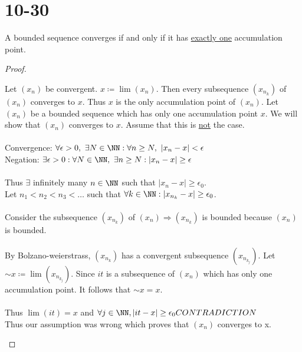 \documentclass[class=scrartcl, crop=false]{standalone}
\begin{document}
\section{10-30}

\begin{theorem}
  A bounded sequence converges if and only if it has \ul{exactly one} accumulation point.
  \begin{proof}
    \begin{itemize}
      \ii[]
      \ii[$(\Rightarrow)$ ]
      Let $(x_n)$ be convergent. $x \coloneqq \lim(x_n)$. Then every subsequence $(x_{n_k})$ of $(x_n)$ converges to $x$. Thus $x$ is the only accumulation point of $(x_n)$.
      \ii[$(\Leftarrow)$ ]
      Let $(x_n)$ be a bounded sequence which has only one accumulation point $x$. We will show that $(x_n)$ converges to $x$. Assume that this is \ul{not} the case.
      \\\\
      Convergence: $\forall \epsilon > 0, \ \exists N \in \NN: \forall n \geq N, \ |x_n - x| < \epsilon$
      \\
      Negation: $\exists \epsilon > 0 : \forall N \in \NN, \ \exists n \geq N: |x_n - x| \geq \epsilon$
      \\\\
      Thus $\exists$ infinitely many $n \in \NN$ such that $|x_n - x| \geq \epsilon_0$.
      \\
      Let $n_1 < n_2 < n_3 < \dots$ such that $\forall k \in \NN : |x_{n_k} - x| \geq \epsilon_0$.
      \\\\
      Consider the subsequence $(x_{n_k})$ of $(x_n) \Rightarrow (x_{n_k})$ is bounded because $(x_n)$ is bounded. 
      \\\\
      By Bolzano-weierstrass, $(x_{n_k})$ has a convergent subsequence $(x_{n_{k_j}})$. Let $\sim{x} \coloneqq \lim(x_{n_{k_j}})$. Since $it$ is a subsequence of $(x_n)$ which has only one accumulation point. It follows that $\sim{x} = x$.
      \\\\
      Thus $\lim(it) = x$ and $\forall j \in \NN, |it - x| \geq \epsilon_0 CONTRADICTION$
      \\
      Thus our assumption was wrong which proves that $(x_n)$ converges to x.
    \end{itemize}
  \end{proof}
\end{theorem}
\end{document}

